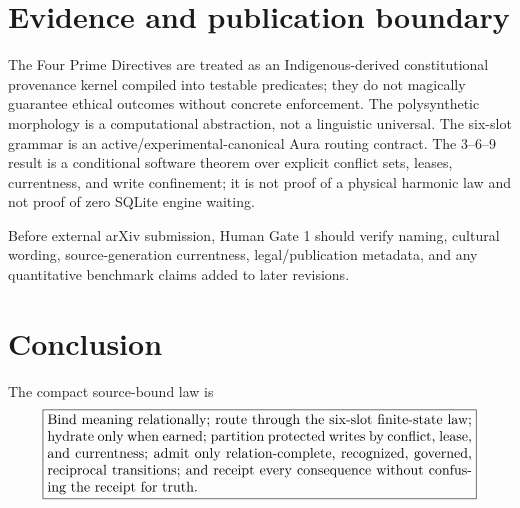 \documentclass[11pt]{article}
\begin{document}
\section*{Evidence and publication boundary}

The Four Prime Directives are treated as an Indigenous-derived constitutional
provenance kernel compiled into testable predicates; they do not magically
guarantee ethical outcomes without concrete enforcement.  The polysynthetic
morphology is a computational abstraction, not a linguistic universal.  The
six-slot grammar is an active/experimental-canonical Aura routing contract.  The
3--6--9 result is a conditional software theorem over explicit conflict sets,
leases, currentness, and write confinement; it is not proof of a physical
harmonic law and not proof of zero SQLite engine waiting.

Before external arXiv submission, Human Gate 1 should verify naming, cultural
wording, source-generation currentness, legal/publication metadata, and any
quantitative benchmark claims added to later revisions.

\section*{Conclusion}

The compact source-bound law is
\[
\boxed{\begin{minipage}{0.88\linewidth}
Bind meaning relationally; route through the six-slot finite-state law; hydrate
only when earned; partition protected writes by conflict, lease, and currentness;
admit only relation-complete, recognized, governed, reciprocal transitions; and
receipt every consequence without confusing the receipt for truth.
\end{minipage}}
\]
\end{document}
